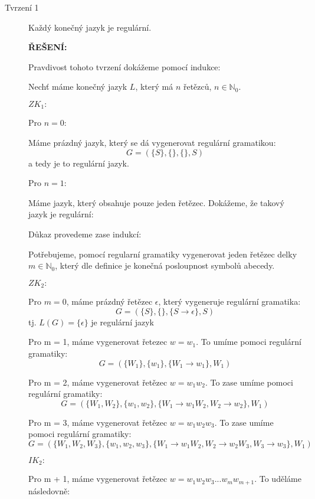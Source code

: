 \documentclass[10pt]{article}
\begin{document}
\begin{description}
    \item[Tvrzení 1] Každý konečný jazyk je regulární.
    
        \textbf{ŘEŠENÍ:} 

        Pravdivost tohoto tvrzení dokážeme pomocí indukce:

        Nechť máme konečný jazyk $L$, který má $n$ řetězců, $n \in \mathbb{N}_0$.

        $ZK_1:$

        Pro $n = 0$: 
        
        Máme prázdný jazyk, který se dá vygenerovat regulární gramatikou: 
        $$G = ( \{S\}, \{\}, \{\}, S)$$ a tedy je to regulární jazyk.

        Pro $n = 1$:

        Máme jazyk, který obsahuje pouze jeden řetězec. Dokážeme, že takový jazyk je regulární:

        Důkaz provedeme zase indukcí:

        Potřebujeme, pomocí regularní gramatiky vygenerovat jeden řetězec delky $m \in \mathbb{N}_0$, který dle definice je konečná posloupnost symbolů abecedy.

        $ZK_2:$

        Pro $m = 0$, máme prázdný řetězec $\epsilon$, který vygeneruje regulární gramatika:
        $$G = (\{S\},\{\}, \{S\rightarrow \epsilon\},S)$$
        tj. $L(G)=\{\epsilon\}$ je regulární jazyk

        Pro m = 1, máme vygenerovat řetezec $w = w_1$. To umíme pomoci regulární gramatiky:
        $$G = (\{W_1\},\{w_1\}, \{W_1\rightarrow w_1\},W_1)$$

        Pro m = 2, máme vygenerovat řetězec $w = w_{1}w_{2}$. To zase umíme pomoci regulární gramatiky:
        $$G = (\{W_1, W_2\},\{w_1, w_2\}, \{W_1\rightarrow w_{1}W_2, W_2 \rightarrow w_2\},W_1)$$

        Pro m = 3, máme vygenerovat řetězec $w = w_{1}w_{2}w_{3}$. To zase umíme pomoci regulární gramatiky:
        $$G = (\{W_1, W_2, W_3\},\{w_1, w_2, w_3\}, \{W_1\rightarrow w_{1}W_2, W_2 \rightarrow w_{2}W_3, W_3 \rightarrow w_3\},W_1)$$

        $IK_2:$

        Pro m + 1, máme vygenerovat řetězec $w = w_{1}w_{2}w_{3}...w_{m}w_{m+1}$. To uděláme následovně:


\end{description}
\end{document}
